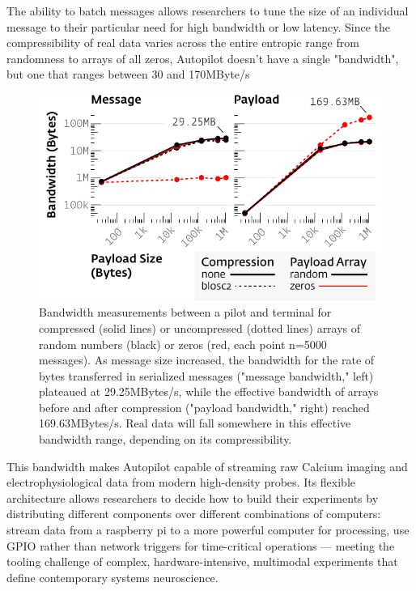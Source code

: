 The ability to batch messages allows researchers to tune the size of an individual message to their particular need for high bandwidth or low latency. Since the compressibility of real data varies across the entire entropic range from randomness to arrays of all zeros, Autopilot doesn't have a single "bandwidth", but one that ranges between 30 and 170MByte/s 

\begin{figure}[t]
\includegraphics[]{figures/networking_bandwidth.pdf}
\caption{Bandwidth measurements between a pilot and terminal for compressed (solid lines) or uncompressed (dotted lines) arrays of random numbers (black) or zeros (red, each point n=5000 messages). As message size increased, the bandwidth for the rate of bytes transferred in serialized messages ("message bandwidth," left) plateaued at 29.25MBytes/s, while the effective bandwidth of arrays before and after compression ("payload bandwidth," right) reached 169.63MBytes/s. Real data will fall somewhere in this effective bandwidth range, depending on its compressibility.}
\label{fig:bandwidth}
\end{figure}

This bandwidth makes Autopilot capable of streaming raw Calcium imaging and electrophysiological data from modern high-density probes. Its flexible architecture allows researchers to decide how to build their experiments by distributing different components over different combinations of computers: stream data from a raspberry pi to a more powerful computer for processing, use GPIO rather than network triggers for time-critical operations --- meeting the tooling challenge of complex, hardware-intensive, multimodal experiments that define contemporary systems neuroscience.